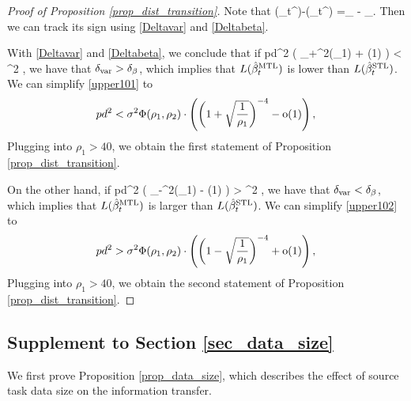 \begin{proof}[Proof of Proposition \ref{prop_dist_transition}]
Note that 
 \be\label{var-beta}\te(\hat{\beta}_t^{\STL})-\te(\hat{\beta}_t^{\MTL}) =\delta_{\vari} - \delta_\beta .\ee
Then we can track its sign using \eqref{Deltavar} and \eqref{Deltabeta}.

 With \eqref{Deltavar} and \eqref{Deltabeta}, we conclude that if
\be\label{upper101}pd^2 \cdot {} \cdot \left( \al_+^2(\rho_1) +  \oo(1) \right) < \sigma^2  \cdot {},\ee
	we have that $\delta_{\text{var}} > \delta_{\beta}$, which implies that $L(\hat{\beta}_t^{\text{MTL}})$ is lower than $L(\hat{\beta}_t^{\text{STL}})$. We can simplify \eqref{upper101} to
	\[   pd^2  <  \sigma^2 \Phi(\rho_1, \rho_2)\cdot \left(\left({1 + \sqrt{\frac 1 {\rho_1}}}\right)^{-4} - \operatorname{o}(1)\right), \]
Plugging into $\rho_1>40$, we obtain the first statement of Proposition \ref{prop_dist_transition}.	
	
	
 On the other hand, if
\be\label{upper102}pd^2 \cdot {} \cdot \left( \al_-^2(\rho_1) -  \oo(1) \right) > \sigma^2  \cdot {},\ee
	we have that $\delta_{\text{var}} < \delta_{\beta}$, which implies that $L(\hat{\beta}_t^{\text{MTL}})$ is larger than $L(\hat{\beta}_t^{\text{STL}})$. We can simplify \eqref{upper102} to
	\[  p d^2  >  \sigma^2 \Phi(\rho_1, \rho_2) \cdot \left(\left({1 - \sqrt{\frac 1 {\rho_1}}}\right)^{-4} +\operatorname{o}(1)\right), \]
Plugging into $\rho_1>40$, we obtain the second statement of Proposition \ref{prop_dist_transition}.
\end{proof}

\subsection{Supplement to Section \ref{sec_data_size}} \label{app_proof_32}
We first prove Proposition \ref{prop_data_size}, which describes the effect of source task data size on the information transfer. 

